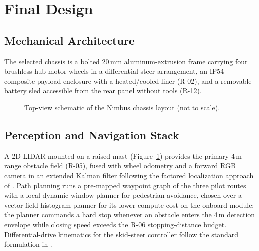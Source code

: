 \section{Final Design}
\label{sec:final-design}

\subsection{Mechanical Architecture}
The selected chassis is a bolted 20\,mm aluminum-extrusion frame carrying four
brushless-hub-motor wheels in a differential-steer arrangement, an IP54
composite payload enclosure with a heated/cooled liner (R-02), and a removable
battery sled accessible from the rear panel without tools (R-12).

\begin{figure}[htbp]
\centering
{}
\caption{Top-view schematic of the Nimbus chassis layout (not to scale).}
\label{fig:chassis}
\end{figure}

\subsection{Perception and Navigation Stack}
A 2D LIDAR mounted on a raised mast (Figure~\ref{fig:chassis}) provides the
primary 4\,m-range obstacle field (R-05), fused with wheel odometry and a
forward RGB camera in an extended Kalman filter following the factored
localization approach of \citet{montemerlo2002fastslam}. Path planning runs
a pre-mapped waypoint graph of the three pilot routes with a local
dynamic-window planner \citep{fox1997dynamic} for pedestrian avoidance,
chosen over a vector-field-histogram planner \citep{ulrich2000vfh} for its
lower compute cost on the onboard module; the planner commands a hard stop
whenever an obstacle enters the 4\,m detection envelope while closing speed
exceeds the R-06 stopping-distance budget. Differential-drive kinematics for
the skid-steer controller follow the standard formulation in
\citet{craig2005introduction}.

